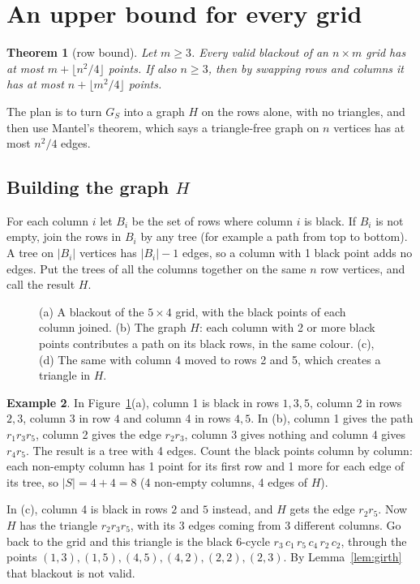 \documentclass[11pt]{article}
\newtheorem{theorem}{Theorem}[section]
\theoremstyle{definition}
\newtheorem{example}[theorem]{Example}
\theoremstyle{remark}
\begin{document}
\section{An upper bound for every grid}\label{sec:rowbound}

\begin{theorem}[row bound]\label{thm:rowbound}
Let $m\ge3$. Every valid blackout of an $n\times m$ grid has at most $m+\lfloor n^2/4\rfloor$
points. If also $n\ge3$, then by swapping rows and columns it has at most
$n+\lfloor m^2/4\rfloor$ points.
\end{theorem}

The plan is to turn $G_S$ into a graph $H$ on the rows alone, with no triangles, and then use
Mantel's theorem, which says a triangle-free graph on $n$ vertices has at most $n^2/4$ edges.

\subsection{Building the graph $H$}

For each column $i$ let $B_i$ be the set of rows where column $i$ is black. If $B_i$ is not
empty, join the rows in $B_i$ by any tree (for example a path from top to bottom). A tree on
$|B_i|$ vertices has $|B_i|-1$ edges, so a column with 1 black point adds no edges. Put the
trees of all the columns together on the same $n$ row vertices, and call the result $H$.

\begin{figure}[htbp]
\centering

\caption{(a) A blackout of the $5\times4$ grid, with the black points of each column joined.
(b) The graph $H$: each column with 2 or more black points contributes a path on its black rows,
in the same colour. (c), (d) The same with column 4 moved to rows 2 and 5, which creates a
triangle in $H$.}
\label{fig:rowbound}
\end{figure}

\begin{example}
In Figure~\ref{fig:rowbound}(a), column 1 is black in rows $1,3,5$, column 2 in rows $2,3$,
column 3 in row $4$ and column 4 in rows $4,5$. In (b), column 1 gives the path $r_1r_3r_5$,
column 2 gives the edge $r_2r_3$, column 3 gives nothing and column 4 gives $r_4r_5$. The result
is a tree with 4 edges. Count the black points column by column: each non-empty column has 1
point for its first row and 1 more for each edge of its tree, so
$|S|=4+4=8$ (4 non-empty columns, 4 edges of $H$).

In (c), column 4 is black in rows $2$ and $5$ instead, and $H$ gets the edge $r_2r_5$. Now $H$
has the triangle $r_2r_3r_5$, with its 3 edges coming from 3 different columns. Go back to the
grid and this triangle is the black 6-cycle $r_3\,c_1\,r_5\,c_4\,r_2\,c_2$, through the points
$(1,3),(1,5),(4,5),(4,2),(2,2),(2,3)$. By Lemma~\ref{lem:girth} that blackout is not valid.
\end{example}
\end{document}
